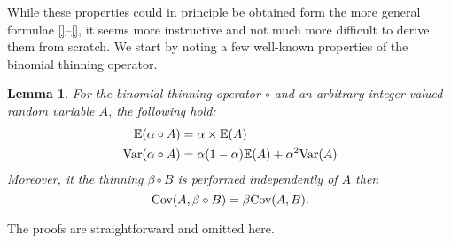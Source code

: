 \documentclass{article}
\newtheorem{lemma}{Lemma}
\begin{document}
While these properties could in principle be obtained form the more general formulae \eqref{}--\eqref{}, it seems more instructive and not much more difficult to derive them from scratch. We start by noting a few well-known properties of the binomial thinning operator.

\begin{lemma}
\label{lemma:properties_thinning}
For the binomial thinning operator $\circ$ and an arbitrary integer-valued random variable $A$, the following hold:
\begin{align*}
\mathbb{E}(\alpha \circ A) & = \alpha \times \mathbb{E}(A)\\
\textnormal{Var}(\alpha \circ A) & = \alpha(1 - \alpha)\mathbb{E}(A) + \alpha^2 \textnormal{Var}(A)
\end{align*}
Moreover, it the thinning $\beta \circ B$ is performed independently of $A$ then
$$
\textnormal{Cov}(A, \beta \circ B) = \beta\textnormal{Cov}(A, B).
$$
\end{lemma}
The proofs are straightforward and omitted here.
\end{document}
